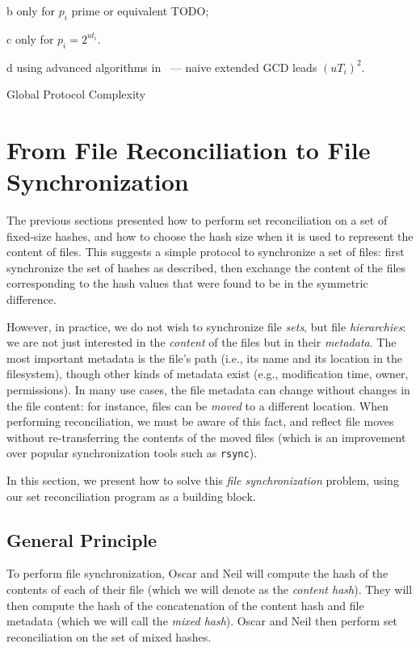 \documentclass[11pt]{llncs}
\newcommand{\rsync}{\texttt{rsync}\xspace}
\begin{document}
\begin{table}[ht]
\begin{threeparttable}
\begin{tablenotes}
    \item[b] only for $p_i$ prime or equivalent TODO;
    \item[c] only for $p_i = 2^{ut_i}$.
    \item[d] using advanced algorithms in~\cite{pan2004rational,wang2003acceleration} --- naive extended GCD leads $(uT_i)^2$.
  \end{tablenotes}
 \end{threeparttable}
  \caption{Global Protocol Complexity}
  \label{tab:workload}
\end{table}

\section{From File Reconciliation to File Synchronization}
\label{files}

The previous sections presented how to perform set reconciliation on a set of
fixed-size hashes, and how to choose the hash size when it is used to represent
the content of files. This suggests a simple protocol to synchronize a set of
files: first synchronize the set of hashes as described, then exchange the
content of the files corresponding to the hash values that were found to be in
the symmetric difference.

However, in practice, we do not wish to synchronize file \emph{sets}, but file
\emph{hierarchies}: we are not just interested in the \emph{content} of the
files but in their \emph{metadata}. The most important metadata is the file's
path (i.e., its name and its location in the filesystem), though other kinds of
metadata exist (e.g., modification time, owner, permissions). In many use
cases, the file metadata can change without changes in the file content: for
instance, files can be \emph{moved} to a different location. When performing
reconciliation, we must be aware of this fact, and reflect file moves without
re-transferring the contents of the moved files (which is an improvement over
popular synchronization tools such as \rsync).

In this section, we present how to solve this \emph{file synchronization}
problem, using our set reconciliation program as a building block.

\subsection{General Principle}

To perform file synchronization, Oscar and Neil will compute the hash of the
contents of each of their file (which we will denote as the \emph{content
hash}). They will then compute the hash of the concatenation of the content hash
and file metadata (which we will call the \emph{mixed hash}). Oscar and Neil
then perform set reconciliation on the set of mixed hashes.
\end{document}
